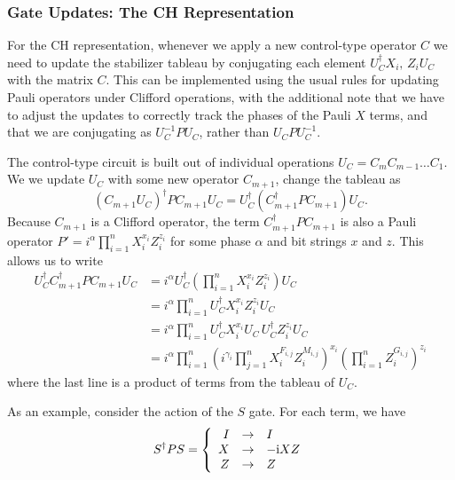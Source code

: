 \subsubsection*{Gate Updates: The CH Representation}
For the CH representation, whenever we apply a new control-type operator $C$ we need to update the stabilizer tableau by conjugating each element $U_{C}^{\dagger}X_{i},\,Z_{i}U_{C}$ with the matrix $C$. This can be implemented using the usual rules for updating Pauli operators under Clifford operations, with the additional note that we have to adjust the updates to correctly track the phases of the Pauli $X$ terms, and that we are conjugating as $U_{C}^{-1}PU_{C}$, rather than $U_{C}PU_{C}^{-1}$. \par
The control-type circuit is built out of individual operations $U_{C}=C_{m}C_{m-1}\dots C_{1}$. We we update $U_{C}$ with some new operator $C_{m+1}$, change the tableau as
\begin{equation}
\left(C_{m+1}U_{C}\right)^{\dagger} P C_{m+1}U_{C} = U_{C}^{\dagger} \left(C_{m+1}^{\dagger}PC_{m+1}\right)U_{C}.
\end{equation}
Because $C_{m+1}$ is a Clifford operator, the term $C^{\dagger}_{m+1}PC_{m+1}$ is also a Pauli operator $P'=i^{\alpha}\prod_{i=1}^{n}X_{i}^{x_{i}}Z_{i}^{z_{i}}$ for some phase $\alpha$ and bit strings $x$ and $z$. This allows us to write
\begin{align}
U_{C}^{\dagger} C_{m+1}^{\dagger}PC_{m+1} U_{C} &= i^{\alpha} U_{C}^{\dagger}\left(\prod_{i=1}^{n}X_{i}^{x_{i}}Z_{i}^{z_{i}}\right)U_{C} \nonumber \\
&= i^{\alpha} \prod_{i=1}^{n} U_{C}^{\dagger} X_{i}^{x_{i}} Z_{i}^{z_{i}}U_{C} \nonumber \\
&= i^{\alpha} \prod_{i=1}^{n}U_{C}^{\dagger} X_{i}^{x_{i}}U_{C}\,U_{C}^{\dagger}Z_{i}^{z_{i}}U_{C} \nonumber \\
&= i^{\alpha} \prod_{i=1}^{n}\left(i^{\gamma_{i}} \prod_{j=1}^{n}X_{i}^{F_{i,j}}Z_{i}^{M_{i,j}}\right)^{x_{i}}\left(\prod_{i=1}^{n}Z_{i}^{G_{i,j}}\right)^{z_{i}}
\label{eq:expanded_leftupdate}
\end{align}
where the last line is a product of terms from the tableau of $U_{C}$.\par
As an example, consider the action of the $S$ gate. For each term, we have
\[
S^{\dagger}PS =  \left\{ \begin{array}{rcl}
    I & \rightarrow & I \\
    X & \rightarrow & -\mathrm{i} XZ \\
    Z & \rightarrow & Z \\
    \end{array}\right.
\]
